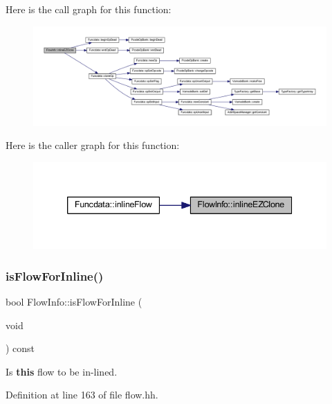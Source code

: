 Here is the call graph for this function\+:
\nopagebreak
\begin{figure}[H]
\begin{center}
\leavevmode
\includegraphics[width=350pt]{class_flow_info_a5819105426192965fb0a73831a785060_cgraph}
\end{center}
\end{figure}
Here is the caller graph for this function\+:
\nopagebreak
\begin{figure}[H]
\begin{center}
\leavevmode
\includegraphics[width=339pt]{class_flow_info_a5819105426192965fb0a73831a785060_icgraph}
\end{center}
\end{figure}
\mbox{\label{class_flow_info_a93657dc63253335308481daf7ed3c7e3}} 
\subsubsection{\texorpdfstring{isFlowForInline()}{isFlowForInline()}}
{\footnotesize\ttfamily bool Flow\+Info\+::is\+Flow\+For\+Inline (\begin{DoxyParamCaption}\item[{void}]{ }\end{DoxyParamCaption}) const\hspace{0.3cm}{\ttfamily [inline]}}



Is {\bfseries{this}} flow to be in-\/lined. 



Definition at line 163 of file flow.\+hh.

